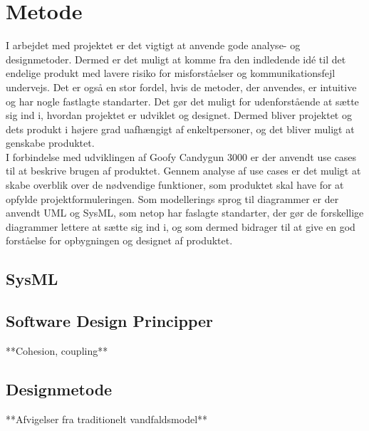 \chapter{Metode}
I arbejdet med projektet er det vigtigt at anvende gode analyse- og designmetoder. Dermed er det muligt at komme fra den indledende idé til det endelige produkt med lavere risiko for misforståelser og kommunikationsfejl undervejs. Det er også en stor fordel, hvis de metoder, der anvendes, er intuitive og har nogle fastlagte standarter. Det gør det muligt for udenforstående at sætte sig ind i, hvordan projektet er udviklet og designet. Dermed bliver projektet og dets produkt i højere grad uafhængigt af enkeltpersoner, og det bliver muligt at genskabe produktet.\\ 
I forbindelse med udviklingen af Goofy Candygun 3000 er der anvendt use cases til at beskrive brugen af produktet. Gennem analyse af use cases er det muligt at skabe overblik over de nødvendige funktioner, som produktet skal have for at opfylde projektformuleringen. Som modellerings sprog til diagrammer er der anvendt UML og SysML, som netop har faslagte standarter, der gør de forskellige diagrammer lettere at sætte sig ind i, og som dermed bidrager til at give en god forståelse for opbygningen og designet af produktet.


\section{SysML}

\section{Software Design Principper}

**Cohesion, coupling**

\section{Designmetode}

**Afvigelser fra traditionelt vandfaldsmodel**